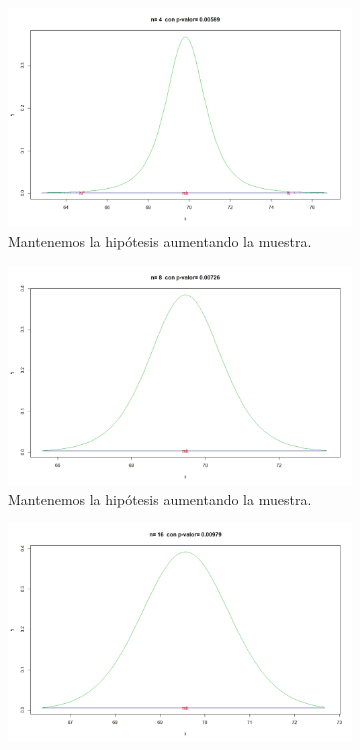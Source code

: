 \begin{figure}[h]
	\begin{subfigure}{0.499\textwidth}
		\includegraphics[width=\linewidth]{assets/ejemplo-4.jpeg}
		\caption{Mantenemos la hipótesis aumentando la muestra.}
		\label{fig:subim5}
	\end{subfigure}
	\begin{subfigure}{0.499\textwidth}
		\includegraphics[width=\linewidth]{assets/ejemplo-8.jpeg}
		\caption{Mantenemos la hipótesis aumentando la muestra.}
		\label{fig:subim6}
	\end{subfigure}
	\begin{subfigure}{0.499\textwidth}
		\includegraphics[width=\linewidth]{assets/ejemplo-16.jpeg}

\end{subfigure}
\end{figure}

